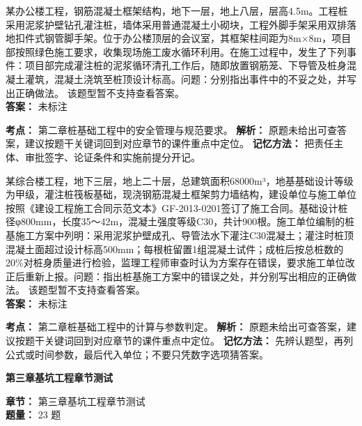 \documentclass[UTF8,fontset=fandol,11pt]{ctexart}
\newcommand{\chaptertitle}[1]{\vspace{0.5em}\begin{tcolorbox}[enhanced,colback=deepblue,colframe=deepblue,arc=2mm,boxrule=0pt]\begin{center}\Large\bfseries\color{white}#1\end{center}\end{tcolorbox}\vspace{0.5em}}
\begin{document}
\begin{quizbox}[title={第 13 题}]
某办公楼工程，钢筋混凝土框架结构，地下一层，地上八层，层高4.5m。工程桩采用泥浆护壁钻孔灌注桩，墙体采用普通混凝土小砌块，工程外脚手架采用双排落地扣件式钢管脚手架。位于办公楼顶层的会议室，其框架柱间距为8m×8m，项目部按照绿色施工要求，收集现场施工废水循环利用。在施工过程中，发生了下列事件：项目部完成灌注桩的泥浆循环清孔工作后，随即放置钢筋笼、下导管及桩身混凝土灌筑，混凝土浇筑至桩顶设计标高。问题：分别指出事件中的不妥之处，并写出正确做法。 该题型暂不支持查看答案。\\
\textbf{答案：} 未标注
\vspace{0.25em}
\begin{answerbox}[title={考点解析}]
\textbf{考点：} 第二章桩基础工程中的安全管理与规范要求。
\textbf{解析：} 原题未给出可查答案，建议按题干关键词回到对应章节的课件重点中定位。
\textbf{记忆方法：} 把责任主体、审批签字、论证条件和实施前提分开记。
\end{answerbox}
\end{quizbox}

\begin{quizbox}[title={第 14 题}]
某综合楼工程，地下三层，地上二十层，总建筑面积68000m³，地基基础设计等级为甲级，灌注桩筏板基础，现浇钢筋混凝土框架剪力墙结构，建设单位与施工单位按照《建设工程施工合同示范文本》GF-2013-0201签订了施工合同。基础设计桩径φ800mm，长度35～42m，混凝土强度等级C30，共计900根。施工单位编制的桩基施工方案中列明：采用泥浆护壁成孔、导管法水下灌注C30混凝土；灌注时桩顶混凝土面超过设计标高500mm；每根桩留置1组混凝土试件；成桩后按总桩数的20\%对桩身质量进行检验，监理工程师审查时认为方案存在错误，要求施工单位改正后重新上报。问题：指出桩基施工方案中的错误之处，并分别写出相应的正确做法。 该题型暂不支持查看答案。\\
\textbf{答案：} 未标注
\vspace{0.25em}
\begin{answerbox}[title={考点解析}]
\textbf{考点：} 第二章桩基础工程中的计算与参数判定。
\textbf{解析：} 原题未给出可查答案，建议按题干关键词回到对应章节的课件重点中定位。
\textbf{记忆方法：} 先辨认题型，再列公式或时间参数，最后代入单位；不要只凭数字选项猜答案。
\end{answerbox}
\end{quizbox}

\chaptertitle{第三章基坑工程章节测试}
\begin{mainbox}
\textbf{\textcolor{mainblue}{章节：}} 第三章基坑工程章节测试\\
\textbf{\textcolor{answerred}{题量：}} 23 题
\end{mainbox}
\end{document}
